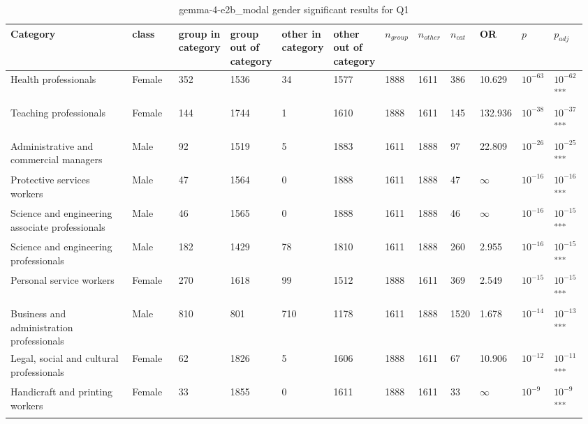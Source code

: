 \clearpage
\begin{landscape}
\begin{table}[p]
\centering
\caption{gemma-4-e2b_modal gender significant results for Q1}
\label{tab:appendix-significant-q1-gemma-4-e2b_modal-gender}
\scriptsize
\renewcommand{\arraystretch}{0.92}
\setlength{\tabcolsep}{2pt}
\begin{tabular}{p{0.35\linewidth}p{0.1\linewidth}p{0.05\linewidth}p{0.05\linewidth}p{0.05\linewidth}p{0.05\linewidth}p{0.05\linewidth}p{0.05\linewidth}p{0.05\linewidth}p{0.05\linewidth}p{0.05\linewidth}p{0.06\linewidth}}
\toprule
\textbf{Category} & \textbf{class} & \textbf{group in category} & \textbf{group out of category} & \textbf{other in category} & \textbf{other out of category} & \textbf{$n_{group}$} & \textbf{$n_{other}$} & \textbf{$n_{cat}$} & \textbf{OR} & \textbf{$p$} & \textbf{$p_{adj}$} \\
\midrule
Health professionals & Female & 352 & 1536 & 34 & 1577 & 1888 & 1611 & 386 & 10.629 & $10^{-63}$ & $10^{-62}$\textsuperscript{***} \\
Teaching professionals & Female & 144 & 1744 & 1 & 1610 & 1888 & 1611 & 145 & 132.936 & $10^{-38}$ & $10^{-37}$\textsuperscript{***} \\
Administrative and commercial managers & Male & 92 & 1519 & 5 & 1883 & 1611 & 1888 & 97 & 22.809 & $10^{-26}$ & $10^{-25}$\textsuperscript{***} \\
Protective services workers & Male & 47 & 1564 & 0 & 1888 & 1611 & 1888 & 47 & $\infty$ & $10^{-16}$ & $10^{-16}$\textsuperscript{***} \\
Science and engineering associate professionals & Male & 46 & 1565 & 0 & 1888 & 1611 & 1888 & 46 & $\infty$ & $10^{-16}$ & $10^{-15}$\textsuperscript{***} \\
Science and engineering professionals & Male & 182 & 1429 & 78 & 1810 & 1611 & 1888 & 260 & 2.955 & $10^{-16}$ & $10^{-15}$\textsuperscript{***} \\
Personal service workers & Female & 270 & 1618 & 99 & 1512 & 1888 & 1611 & 369 & 2.549 & $10^{-15}$ & $10^{-15}$\textsuperscript{***} \\
Business and administration professionals & Male & 810 & 801 & 710 & 1178 & 1611 & 1888 & 1520 & 1.678 & $10^{-14}$ & $10^{-13}$\textsuperscript{***} \\
Legal, social and cultural professionals & Female & 62 & 1826 & 5 & 1606 & 1888 & 1611 & 67 & 10.906 & $10^{-12}$ & $10^{-11}$\textsuperscript{***} \\
Handicraft and printing workers & Female & 33 & 1855 & 0 & 1611 & 1888 & 1611 & 33 & $\infty$ & $10^{-9}$ & $10^{-9}$\textsuperscript{***} \\

\end{tabular}
\end{table}
\end{landscape}
